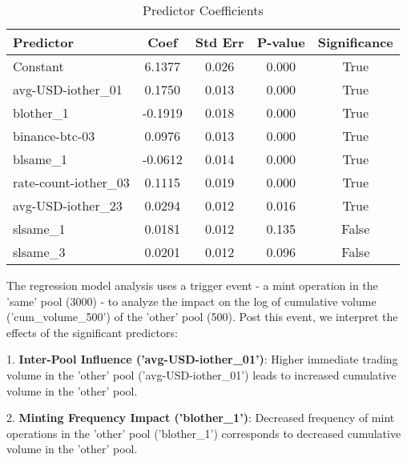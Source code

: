 \documentclass{article}
\begin{document}
\begin{table}[htbp]
  \centering
  \begin{tabular}{|l|c|c|c|c|}
  \hline
  \textbf{Predictor}        & \textbf{Coef} & \textbf{Std Err} & \textbf{P-value} & \textbf{Significance} \\
  \hline
  Constant                  & 6.1377        & 0.026            & 0.000            & True                  \\
  avg-USD-iother\_01       & 0.1750        & 0.013            & 0.000            & True                  \\
  blother\_1               & -0.1919       & 0.018            & 0.000            & True                  \\
  binance-btc-03          & 0.0976        & 0.013            & 0.000            & True                  \\
  blsame\_1                & -0.0612       & 0.014            & 0.000            & True                  \\
  rate-count-iother\_03    & 0.1115        & 0.019            & 0.000            & True                  \\
  avg-USD-iother\_23       & 0.0294        & 0.012            & 0.016            & True                  \\
  slsame\_1                & 0.0181        & 0.012            & 0.135            & False                 \\
  slsame\_3                & 0.0201        & 0.012            & 0.096            & False                 \\
  \hline
  \end{tabular}
  \caption{Predictor Coefficients}
  \label{tab:predictor-coefficients}
\end{table}

The regression model analysis uses a trigger event - a mint operation in the 'same' pool (3000) - to analyze the impact on the log of cumulative volume ('cum\_volume\_500') of the 'other' pool (500). Post this event, we interpret the effects of the significant predictors:

1. \textbf{Inter-Pool Influence ('avg-USD-iother\_01')}: Higher immediate trading volume in the 'other' pool ('avg-USD-iother\_01') leads to increased cumulative volume in the 'other' pool. 

2. \textbf{Minting Frequency Impact ('blother\_1')}: Decreased frequency of mint operations in the 'other' pool ('blother\_1') corresponds to decreased cumulative volume in the 'other' pool.
\end{document}
